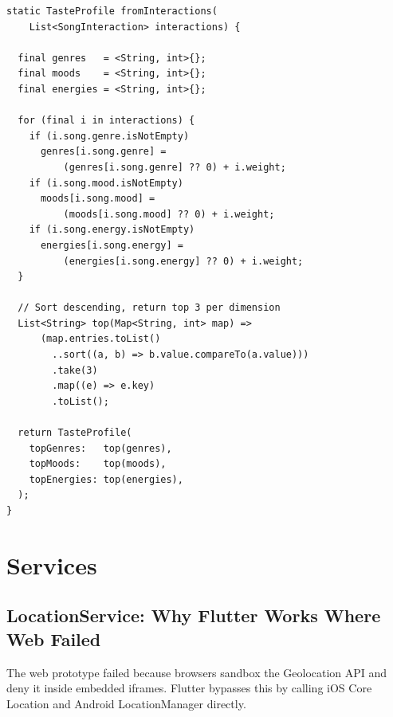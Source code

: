 \documentclass[12pt, a4paper]{report}
\begin{document}
\begin{tcolorbox}[cyanbox, title=fromInteractions() --- Passive Learning]
\begin{lstlisting}[style=dartcode]
static TasteProfile fromInteractions(
    List<SongInteraction> interactions) {

  final genres   = <String, int>{};
  final moods    = <String, int>{};
  final energies = <String, int>{};

  for (final i in interactions) {
    if (i.song.genre.isNotEmpty)
      genres[i.song.genre] =
          (genres[i.song.genre] ?? 0) + i.weight;
    if (i.song.mood.isNotEmpty)
      moods[i.song.mood] =
          (moods[i.song.mood] ?? 0) + i.weight;
    if (i.song.energy.isNotEmpty)
      energies[i.song.energy] =
          (energies[i.song.energy] ?? 0) + i.weight;
  }

  // Sort descending, return top 3 per dimension
  List<String> top(Map<String, int> map) =>
      (map.entries.toList()
        ..sort((a, b) => b.value.compareTo(a.value)))
        .take(3)
        .map((e) => e.key)
        .toList();

  return TasteProfile(
    topGenres:   top(genres),
    topMoods:    top(moods),
    topEnergies: top(energies),
  );
}
\end{lstlisting}
\end{tcolorbox}

\chapter{Services}

\section{LocationService: Why Flutter Works Where Web Failed}

The web prototype failed because browsers sandbox the Geolocation API
and deny it inside embedded iframes. Flutter bypasses this by calling
iOS Core Location and Android LocationManager directly.
\end{document}
